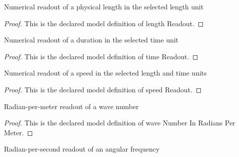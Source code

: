 \begin{definition}
  \label{def:physics:phyx-mini-0289:phyxminiproblems-problemphyxmini0289-lengthreadout}
  Numerical readout of a physical length in the selected length unit
\end{definition}
\begin{proof}
  This is the declared model definition of length Readout.
\end{proof}
\begin{definition}
  \label{def:physics:phyx-mini-0289:phyxminiproblems-problemphyxmini0289-timereadout}
  Numerical readout of a duration in the selected time unit
\end{definition}
\begin{proof}
  This is the declared model definition of time Readout.
\end{proof}
\begin{definition}
  \label{def:physics:phyx-mini-0289:phyxminiproblems-problemphyxmini0289-speedreadout}
  Numerical readout of a speed in the selected length and time units
\end{definition}
\begin{proof}
  This is the declared model definition of speed Readout.
\end{proof}
\begin{definition}
  \label{def:physics:phyx-mini-0289:phyxminiproblems-problemphyxmini0289-wavenumberinradianspermeter}
  Radian-per-meter readout of a wave number
\end{definition}
\begin{proof}
  This is the declared model definition of wave Number In Radians Per Meter.
\end{proof}
\begin{definition}
  \label{def:physics:phyx-mini-0289:phyxminiproblems-problemphyxmini0289-angularfrequencyinradianspersecond}
  Radian-per-second readout of an angular frequency
\end{definition}
